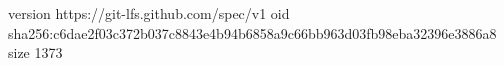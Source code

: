 version https://git-lfs.github.com/spec/v1
oid sha256:c6dae2f03c372b037c8843e4b94b6858a9c66bb963d03fb98eba32396e3886a8
size 1373
